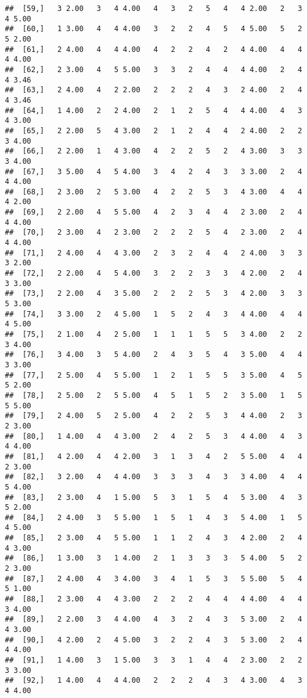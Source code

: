 \documentclass[]{article}
\begin{document}
\begin{verbatim}
##  [59,]   3 2.00   3   4 4.00   4   3   2   5   4   4 2.00   2   3   4 5.00
##  [60,]   1 3.00   4   4 4.00   3   2   2   4   5   4 5.00   5   2   5 2.00
##  [61,]   2 4.00   4   4 4.00   4   2   2   4   2   4 4.00   4   4   4 4.00
##  [62,]   2 3.00   4   5 5.00   3   3   2   4   4   4 4.00   2   4   4 3.46
##  [63,]   2 4.00   4   2 2.00   2   2   2   4   3   2 4.00   2   4   4 3.46
##  [64,]   1 4.00   2   2 4.00   2   1   2   5   4   4 4.00   4   3   4 3.00
##  [65,]   2 2.00   5   4 3.00   2   1   2   4   4   2 4.00   2   2   3 4.00
##  [66,]   2 2.00   1   4 3.00   4   2   2   5   2   4 3.00   3   3   3 4.00
##  [67,]   3 5.00   4   5 4.00   3   4   2   4   3   3 3.00   2   4   4 4.00
##  [68,]   2 3.00   2   5 3.00   4   2   2   5   3   4 3.00   4   4   4 2.00
##  [69,]   2 2.00   4   5 5.00   4   2   3   4   4   2 3.00   2   4   4 4.00
##  [70,]   2 3.00   4   2 3.00   2   2   2   5   4   2 3.00   2   4   4 4.00
##  [71,]   2 4.00   4   4 3.00   2   3   2   4   4   2 4.00   3   3   3 2.00
##  [72,]   2 2.00   4   5 4.00   3   2   2   3   3   4 2.00   2   4   3 3.00
##  [73,]   2 2.00   4   3 5.00   2   2   2   5   3   4 2.00   3   3   5 3.00
##  [74,]   3 3.00   2   4 5.00   1   5   2   4   3   4 4.00   4   4   4 5.00
##  [75,]   2 1.00   4   2 5.00   1   1   1   5   5   3 4.00   2   2   3 4.00
##  [76,]   3 4.00   3   5 4.00   2   4   3   5   4   3 5.00   4   4   3 3.00
##  [77,]   2 5.00   4   5 5.00   1   2   1   5   5   3 5.00   4   5   5 2.00
##  [78,]   2 5.00   2   5 5.00   4   5   1   5   2   3 5.00   1   5   5 5.00
##  [79,]   2 4.00   5   2 5.00   4   2   2   5   3   4 4.00   2   3   2 3.00
##  [80,]   1 4.00   4   4 3.00   2   4   2   5   3   4 4.00   4   3   4 4.00
##  [81,]   4 2.00   4   4 2.00   3   1   3   4   2   5 5.00   4   4   2 3.00
##  [82,]   3 2.00   4   4 4.00   3   3   3   4   3   3 4.00   4   4   5 4.00
##  [83,]   2 3.00   4   1 5.00   5   3   1   5   4   5 3.00   4   3   5 2.00
##  [84,]   2 4.00   3   5 5.00   1   5   1   4   3   5 4.00   1   5   4 5.00
##  [85,]   2 3.00   4   5 5.00   1   1   2   4   3   4 2.00   2   4   4 3.00
##  [86,]   1 3.00   3   1 4.00   2   1   3   3   3   5 4.00   5   2   2 3.00
##  [87,]   2 4.00   4   3 4.00   3   4   1   5   3   5 5.00   5   4   5 1.00
##  [88,]   2 3.00   4   4 3.00   2   2   2   4   4   4 4.00   4   4   3 4.00
##  [89,]   2 2.00   3   4 4.00   4   3   2   4   3   5 3.00   2   4   4 3.00
##  [90,]   4 2.00   2   4 5.00   3   2   2   4   3   5 3.00   2   4   4 4.00
##  [91,]   1 4.00   3   1 5.00   3   3   1   4   4   2 3.00   2   2   3 3.00
##  [92,]   1 4.00   4   4 4.00   2   2   2   4   3   4 3.00   4   3   4 4.00

\end{verbatim}
\end{document}
